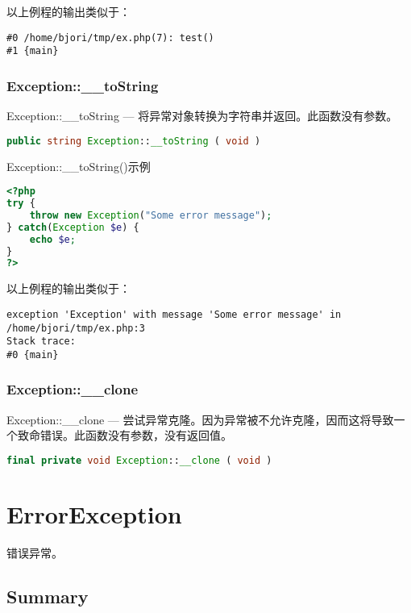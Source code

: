以上例程的输出类似于：

\begin{verbatim}
#0 /home/bjori/tmp/ex.php(7): test()
#1 {main}
\end{verbatim}

\subsection{Exception::\_\_toString}

Exception::\_\_toString — 将异常对象转换为字符串并返回。此函数没有参数。

\begin{lstlisting}[language=PHP]
public string Exception::__toString ( void )
\end{lstlisting}



\begin{example}
Exception::\_\_toString()示例
\begin{lstlisting}[language=PHP]
<?php
try {
    throw new Exception("Some error message");
} catch(Exception $e) {
    echo $e;
}
?>
\end{lstlisting}
\end{example}

以上例程的输出类似于：

\begin{verbatim}
exception 'Exception' with message 'Some error message' in /home/bjori/tmp/ex.php:3
Stack trace:
#0 {main}
\end{verbatim}


\subsection{Exception::\_\_clone}

Exception::\_\_clone — 尝试异常克隆。因为异常被不允许克隆，因而这将导致一个致命错误。此函数没有参数，没有返回值。

\begin{lstlisting}[language=PHP]
final private void Exception::__clone ( void )
\end{lstlisting}



\chapter{ErrorException}

错误异常。

\section{Summary}




